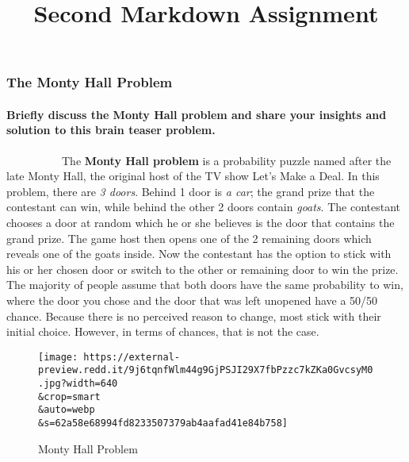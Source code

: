 \documentclass[
]{article}
\title{Second Markdown Assignment}
\author{}
\date{\vspace{-2.5em}}
\begin{document}
\maketitle

\hypertarget{the-monty-hall-problem}{%
\subsubsection{\texorpdfstring{\textbf{The Monty Hall
Problem}}{The Monty Hall Problem}}\label{the-monty-hall-problem}}

\hypertarget{briefly-discuss-the-monty-hall-problem-and-share-your-insights-and-solution-to-this-brain-teaser-problem.}{%
\paragraph{\texorpdfstring{ Briefly discuss the Monty Hall problem and
share your insights and solution to this brain teaser
problem.}{ Briefly discuss the Monty Hall problem and share your insights and solution to this brain teaser problem.}}\label{briefly-discuss-the-monty-hall-problem-and-share-your-insights-and-solution-to-this-brain-teaser-problem.}}

~~~~~~~~~~The \textbf{Monty Hall problem} is a probability puzzle named
after the late Monty Hall, the original host of the TV show Let's Make a
Deal. In this problem, there are \emph{3 doors}. Behind 1 door is
\emph{a car}; the grand prize that the contestant can win, while behind
the other 2 doors contain \emph{goats}. The contestant chooses a door at
random which he or she believes is the door that contains the grand
prize. The game host then opens one of the 2 remaining doors which
reveals one of the goats inside. Now the contestant has the option to
stick with his or her chosen door or switch to the other or remaining
door to win the prize. The majority of people assume that both doors
have the same probability to win, where the door you chose and the door
that was left unopened have a 50/50 chance. Because there is no
perceived reason to change, most stick with their initial choice.
However, in terms of chances, that is not the case.

\begin{figure}
\centering
\texttt{[image: https://external-preview.redd.it/9j6tqnfWlm44g9GjPSJI29X7fbPzzc7kZKa0GvcsyM0.jpg?width=640\\\&crop=smart\\\&auto=webp\\\&s=62a58e68994fd8233507379ab4aafad41e84b758]}
\caption{Monty Hall Problem}
\end{figure}
\end{document}
